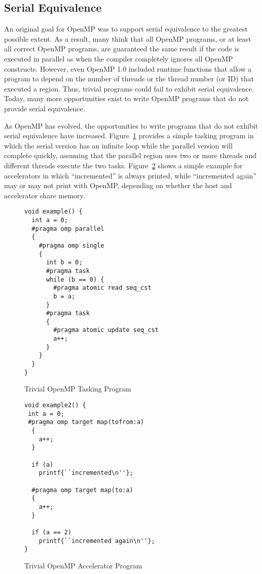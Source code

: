 \subsection{Serial Equivalence}
\label{sub:serial_equivalence}

An original goal for OpenMP was to support serial equivalence to the 
greatest possible extent. As a result, many think that all OpenMP programs, 
or at least all correct OpenMP programs, are guaranteed the same result
if the code is executed in parallel as when the compiler completely 
ignores all OpenMP constructs. However, even OpenMP 1.0 included runtime
functions that allow a program to depend on the number of threads or the
thread number (or ID) that executed a region. Thus, trivial programs could
fail to exhibit serial equivalence. Today, many more opportunities exist
to write OpenMP programs that do not provide serial equivalence. 

As OpenMP has evolved, the opportunities to write programs that do not
exhibit serial equivalence have increased. Figure~\ref{fig:trivial_task} 
provides a simple tasking program in which the serial version has an infinite 
loop while the parallel version will complete quickly, assuming that the 
parallel region uses two or more threads and different threads execute the 
two tasks. Figure~\ref{fig:trivial_target} shows a simple example for 
accelerators in which ``incremented'' is always printed, while 
``incremented again'' may or may not print with OpenMP, depending on 
whether the host and accelerator share memory. 

\begin{figure}
\begin{verbatim}
void example() {
  int a = 0;
  #pragma omp parallel
  {
    #pragma omp single
    {
      int b = 0;
      #pragma task
      while (b == 0) {
        #pragma atomic read seq_cst
        b = a;
      }
      #pragma task
      {
        #pragma atomic update seq_cst
        a++;
      }
    }
  }
}
\end{verbatim}
\caption{Trivial OpenMP Tasking Program\label{fig:trivial_task}}
\end{figure}

\begin{figure}
\begin{verbatim}
void example2() {
 int a = 0;
 #pragma omp target map(tofrom:a)
  {
    a++;
  }

  if (a)
    printf{``incremented\n''};
  
  #pragma omp target map(to:a)
  {
    a++;
  }

  if (a == 2)
    printf{``incremented again\n''};
}
\end{verbatim}
\caption{Trivial OpenMP Accelerator Program\label{fig:trivial_target}}
\end{figure}


